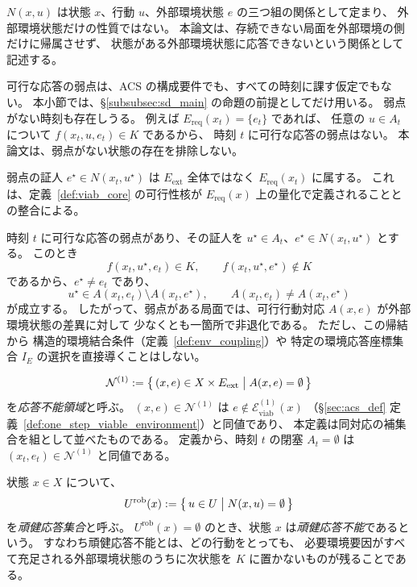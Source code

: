 \begin{remark}
\label{rem:nonresponse_relational}
$N(x,u)$ は状態 $x$、行動 $u$、外部環境状態 $e$ の三つ組の関係として定まり、
外部環境状態だけの性質ではない。
本論文は、存続できない局面を外部環境の側だけに帰属させず、
状態がある外部環境状態に応答できないという関係として記述する。

可行な応答の弱点は、ACS の構成要件でも、すべての時刻に課す仮定でもない。
本小節では、\S\ref{subsubsec:sd_main} の命題の前提としてだけ用いる。
弱点がない時刻も存在しうる。
例えば $E_{\mathrm{req}}(x_t)=\{e_t\}$ であれば、
任意の $u\in A_t$ について $f(x_t,u,e_t)\in K$ であるから、
時刻 $t$ に可行な応答の弱点はない。
本論文は、弱点がない状態の存在を排除しない。

弱点の証人 $e^\star\in N(x_t,u^\star)$ は $E_{\mathrm{ext}}$ 全体ではなく
$E_{\mathrm{req}}(x_t)$ に属する。
これは、定義~\ref{def:viab_core} の可行性核が $E_{\mathrm{req}}(x)$ 上の量化で定義されることとの整合による。
\end{remark}

\begin{remark}[可行な応答の弱点が含意する環境差]
\label{rem:weakness_env_difference}
時刻 $t$ に可行な応答の弱点があり、その証人を
$u^\star\in A_t$、$e^\star\in N(x_t,u^\star)$ とする。
このとき
\[
  f(x_t,u^\star,e_t)\in K,
  \qquad
  f(x_t,u^\star,e^\star)\notin K
\]
であるから、$e^\star\neq e_t$ であり、
\[
  u^\star\in A(x_t,e_t)\setminus A(x_t,e^\star),
  \qquad
  A(x_t,e_t)\neq A(x_t,e^\star)
\]
が成立する。
したがって、弱点がある局面では、可行行動対応 $A(x,e)$ が外部環境状態の差異に対して
少なくとも一箇所で非退化である。
ただし、この帰結から
構造的環境結合条件（定義~\ref{def:env_coupling}）や
特定の環境応答座標集合 $I_E$ の選択を直接導くことはしない。
\end{remark}

\begin{definition}
\label{def:nonresponse_region}
\[
  \mathcal N^{(1)}
  :=
  \bigl\{\,(x,e)\in X\times E_{\mathrm{ext}}\bigm| A(x,e)=\emptyset\,\bigr\}
\]
を\emph{応答不能領域}と呼ぶ。
$(x,e)\in\mathcal N^{(1)}$ は $e\notin\mathcal E_{\mathrm{viab}}^{(1)}(x)$
（\S\ref{sec:acs_def} 定義~\ref{def:one_step_viable_environment}）と同値であり、
本定義は同対応の補集合を組として並べたものである。
定義から、時刻 $t$ の閉塞 $A_t=\emptyset$ は $(x_t,e_t)\in\mathcal N^{(1)}$ と同値である。
\end{definition}

\begin{definition}
\label{def:robust_response}
状態 $x\in X$ について、
\[
  U^{\mathrm{rob}}(x)
  :=
  \bigl\{\,u\in U\bigm| N(x,u)=\emptyset\,\bigr\}
\]
を\emph{頑健応答集合}と呼ぶ。
$U^{\mathrm{rob}}(x)=\emptyset$ のとき、状態 $x$ は\emph{頑健応答不能}であるという。
すなわち頑健応答不能とは、どの行動をとっても、
必要環境要因がすべて充足される外部環境状態のうちに次状態を $K$ に置かないものが残ることである。
\end{definition}

